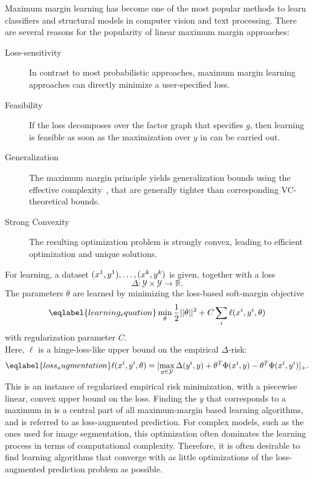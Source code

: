 Maximum margin learning has become one of the most popular methods to learn
classifiers and structural models in computer vision and text processing.
There are several reasons for the popularity of linear maximum margin approaches:
\begin{description}
    \item[Loss-sensitivity] In contrast to most probabilistic approaches, maximum margin learning approaches can directly
        minimize a user-specified loss.
    \item[Feasibility] If the loss decomposes over the factor graph that
        specifies $g$, then learning is feasible as soon as the maximization
        over $y$ in  can be carried out.
    \item[Generalization] The maximum margin principle yields generalization
        bounds using the effective complexity~\citep{taskar2003max}, that are generally
        tighter than corresponding VC-theoretical bounds.
    \item[Strong Convexity] The resulting optimization problem is strongly
        convex, leading to efficient optimization and unique solutions.
\end{description}

For learning, a dataset $(x^{1}, y^{1}),\dotsc,(x^{k}, y^{k})$ is given, together with a loss
\begin{equation}
    \Delta \colon \mathcal{Y} \times \mathcal{Y} \rightarrow \mathbb{R}.
\end{equation}
The parameters $\theta$ are learned by minimizing the loss-based soft-margin
objective
\begin{equation}\eqlabel{learning_equation}
    \min_\theta \frac{1}{2} ||\theta||^2 + C \sum_i  \ell(x\hoch{i}, y\hoch{i}, \theta)
\end{equation}
with regularization parameter $C$.\pagebreak\\
Here, $\ell$ is a hinge-loss-like upper bound
on the empirical $\Delta$-risk:
\begin{equation}\eqlabel{loss_augmentation}
    \ell(x\hoch{i}, y\hoch{i}, \theta) = [\max_{y \in \mathcal{Y}} \Delta(y\hoch{i}, y) + \theta^T \Phi(x\hoch{i}, y) - \theta^T \Phi(x\hoch{i}, y\hoch{i})]_+.
\end{equation}
This is an instance of regularized empirical risk minimization, with a
piecewise linear, convex upper bound on the loss. 
Finding the $y$ that corresponds to a maximum in  is
a central part of all maximum-margin based learning algorithms, and is referred to
as loss-augmented prediction. For complex models, such as the ones used for
image segmentation, this optimization often dominates the learning process in
terms of computational complexity.
Therefore, it is often desirable to find learning algorithms that converge with
as little optimizations of the loss-augmented prediction problem as possible.

